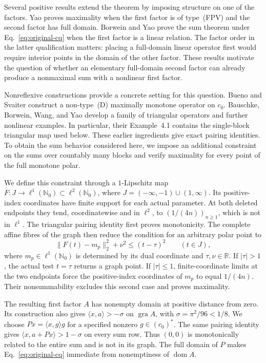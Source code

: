 \documentclass[11pt]{article}
\newcommand{\R}{\mathbb R}
\newcommand{\Nzero}{\mathbb N_0}
\newcommand{\gra}{\operatorname{gra}}
\newcommand{\dom}{\operatorname{dom}}
\begin{document}
Several positive results extend the theorem by imposing structure on one
of the factors. Yao \cite{yao2010} proves maximality when the first factor
is of type~(FPV) and the second factor has full domain. Borwein and Yao
\cite{borweinyao2012} prove the sum theorem under
Eq.~\eqref{eq:original-cq} when the first factor is a linear relation.
The factor order in the latter qualification matters: placing a
full-domain linear operator first would require interior points in the
domain of the other factor. These results motivate the question of
whether an elementary full-domain second factor can already produce a
nonmaximal sum with a nonlinear first factor.

Nonreflexive constructions provide a concrete setting for this question.
Bueno and Svaiter \cite{buenosvaiter2011} construct a non-type~(D)
maximally monotone operator on $c_0$. Bauschke, Borwein, Wang, and Yao
\cite{bauschkeetal2011} develop a family of triangular operators and
further nonlinear examples. In particular, their Example~4.1 contains
the single-block triangular map used below. These earlier ingredients
give exact pairing identities. To obtain the sum behavior considered
here, we impose an additional constraint on the sums over countably many
blocks and verify maximality for every point of the full monotone polar.

We define this constraint through a $1$-Lipschitz map
$F:J\to\ell^1(\Nzero)\subset\ell^2(\Nzero)$, where
$J=(-\infty,-1)\cup(1,\infty)$. Its positive-index coordinates have finite
support for each actual parameter. At both deleted endpoints they tend,
coordinatewise and in $\ell^2$, to
$(1/(4n))_{n\ge1}$, which is not in $\ell^1$.
The triangular pairing identity first proves monotonicity. The complete
affine fibres of the graph then reduce the condition for an arbitrary
polar point to
\begin{equation}
\|F(t)-m_p\|_2^2+\nu^2\le(t-\tau)^2
\qquad(t\in J),
\label{eq:polar-intro}
\end{equation}
where $m_p\in\ell^1(\Nzero)$ is determined by its dual coordinate and
$\tau,\nu\in\R$. If $|\tau|>1$, the actual test $t=\tau$ returns a graph
point. If $|\tau|\le1$, finite-coordinate limits at the two endpoints
force the positive-index coordinates of $m_p$ to equal $1/(4n)$.
Their nonsummability excludes this second case and proves maximality.

The resulting first factor $A$ has nonempty domain at positive distance
from zero. Its construction also gives
$\langle x,a\rangle>-\sigma$ on $\gra A$, with
$\sigma=\pi^2/96<1/8$. We choose
$Px=\langle x,g\rangle g$ for a specified nonzero $g\in(c_0)^*$.
The same pairing identity gives
$\langle x,a+Px\rangle>1-\sigma$ on every sum row.
Thus $(0,0)$ is monotonically related to the entire sum and is not in
its graph. The full domain of $P$ makes
Eq.~\eqref{eq:original-cq} immediate from nonemptiness of $\dom A$.
\end{document}
